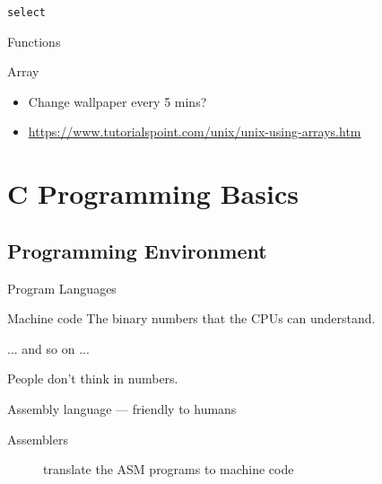 \begin{frame}{\texttt{select}}
  \begin{center}
  \end{center}
\end{frame}

\begin{frame}{Functions}
\end{frame}

\begin{frame}{Array}
  \begin{center}
  \end{center}
  \begin{itemize}
  \item[\hw] Change wallpaper every 5 mins?
  \end{itemize}
\end{frame}

\begin{itemize}
\item \url{https://www.tutorialspoint.com/unix/unix-using-arrays.htm}
\end{itemize}

\section{C Programming Basics}
\label{sec:c-programming-basics}

\subsection{Programming Environment}
\label{sec:progr-envir}

\begin{frame}{Program Languages}
  \begin{block}{Machine code}
    The \alert{binary numbers} that the CPUs can understand.
    \begin{center}{ ... and so on ...}
    \end{center}
    People don't think in numbers.
  \end{block}
  \begin{block}{Assembly language --- friendly to humans}
    \begin{center}
    \end{center}
    \begin{description}
    \item[Assemblers] translate the ASM programs to machine code
    \end{description}
  \end{block}
\end{frame}

